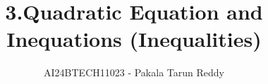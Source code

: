 \documentclass[journal]{IEEEtran}
\begin{document}

\vspace{3cm}


\renewcommand{\thefigure}{\theenumi}
\renewcommand{\thetable}{\theenumi}
\setlength{\intextsep}{10pt} %


\renewcommand{\thetable}{\theenumi}
\title{3.Quadratic Equation and\\ Inequations (Inequalities)}
\author{AI24BTECH11023 - Pakala Tarun Reddy}
\maketitle
\end{document}
